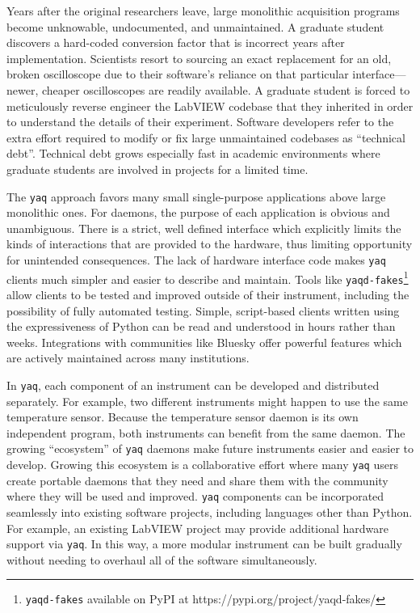 \documentclass[aip, amsmath, amssymb, reprint,]{revtex4-2}
\newcommand\yaq{\texttt{yaq}}
\begin{document}
Years after the original researchers leave, large monolithic acquisition programs become unknowable, undocumented, and unmaintained.
A graduate student discovers a hard-coded conversion factor that is incorrect years after implementation.
Scientists resort to sourcing an exact replacement for an old, broken oscilloscope due to their software's reliance on that particular interface---newer, cheaper oscilloscopes are readily available.
A graduate student is forced to meticulously reverse engineer the LabVIEW codebase that they inherited in order to understand the details of their experiment.
Software developers refer to the extra effort required to modify or fix large unmaintained codebases as ``technical debt''.\cite{Allman_2012}
Technical debt grows especially fast in academic environments where graduate students are involved in projects for a limited time.

The \yaq{} approach favors many small single-purpose applications above large monolithic ones.
For daemons, the purpose of each application is obvious and unambiguous.
There is a strict, well defined interface which explicitly limits the kinds of interactions that are provided to the hardware, thus limiting opportunity for unintended consequences.
The lack of hardware interface code makes \yaq{} clients much simpler and easier to describe and maintain.
Tools like \texttt{yaqd-fakes}\footnote{\texttt{yaqd-fakes} available on PyPI at https://pypi.org/project/yaqd-fakes/} allow clients to be tested and improved outside of their instrument, including the possibility of fully automated testing.
Simple, script-based clients written using the expressiveness of Python can be read and understood in hours rather than weeks.
Integrations with communities like Bluesky offer powerful features which are actively maintained across many institutions.

In \yaq{}, each component of an instrument can be developed and distributed separately.
For example, two different instruments might happen to use the same temperature sensor.
Because the temperature sensor daemon is its own independent program, both instruments can benefit from the same daemon.
The growing ``ecosystem'' of \yaq{} daemons make future instruments easier and easier to develop.
Growing this ecosystem is a collaborative effort where many \yaq{} users create portable daemons that they need and share them with the community where they will be used and improved.
\yaq{} components can be incorporated seamlessly into existing software projects, including languages other than Python.
For example, an existing LabVIEW project may provide additional hardware support via \yaq{}.
In this way, a more modular instrument can be built gradually without needing to overhaul all of the software simultaneously.
\end{document}
